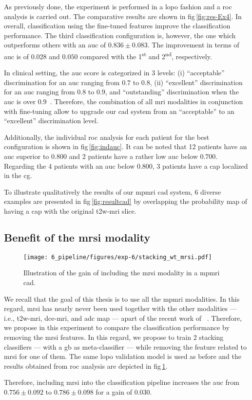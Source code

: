 As previously done, the experiment is performed in a \ac{lopo} fashion and a \ac{roc} analysis is carried out.
The comparative results are shown in \acs{fig}\,\ref{fig:res-Ex4}.
In overall, classification using the fine-tuned features improve the classification performance.
The third classification configuration is, however, the one which outperforms others with an \ac{auc} of $0.836 \pm 0.083$.
The improvement in terms of \ac{auc} is of $0.028$ and $0.050$ compared with the 1\textsuperscript{st} and 2\textsuperscript{nd}, respectively.

In clinical setting, the \ac{auc} score is categorized in 3 levels: (i) ``acceptable'' discrimination for an \ac{auc} ranging from $0.7$ to $0.8$, (ii) ``excellent'' discrimination for an \ac{auc} ranging from $0.8$ to $0.9$, and ``outstanding'' discrimination when the \ac{auc} is over $0.9$~\cite{hosmer2004applied}.
Therefore, the combination of all \ac{mri} modalities in conjunction with fine-tuning allow to upgrade our \ac{cad} system from an ``acceptable'' to an ``excellent'' discrimination level.

Additionally, the individual \ac{roc} analysis for each patient for the best configuration is shown in \acs{fig}\,\ref{fig:indauc}.
It can be noted that 12 patients have an \ac{auc} superior to $0.800$ and 2 patients have a rather low \ac{auc} below $0.700$.
Regarding the 4 patients with an \ac{auc} below $0.800$, 3 patients have a \ac{cap} localized in the \ac{cg}.

To illustrate qualitatively the results of our \ac{mpmri} \ac{cad} system, 6 diverse examples are presented in \acs{fig}\,\ref{fig:resultcad} by overlapping the probability map of having a \ac{cap} with the original \ac{t2w}-\ac{mri} slice.

\subsection{Benefit of the \acs*{mrsi} modality}\label{subsec:chp6:exp-res:Ex5}

\begin{figure}
  \centering
  \texttt{[image: 6\_pipeline/figures/exp-6/stacking\_wt\_mrsi.pdf]}
  \caption{Illustration of the gain of including the \acs*{mrsi} modality in a \acs*{mpmri} \acs*{cad}.}
  \label{fig:resmrsigain}
\end{figure}

We recall that the goal of this thesis is to use all the \ac{mpmri} modalities.
In this regard, \ac{mrsi} has nearly never been used together with the other modalities --- i.e., \ac{t2w}-\ac{mri}, \ac{dce}-\ac{mri}, and \ac{adc} map --- apart of the recent work of \citeauthor{trigui2017automatic}~\cite{trigui2016classification,trigui2017automatic}.
Therefore, we propose in this experiment to compare the classification performance by removing the \ac{mrsi} features.
In this regard, we propose to train 2 stacking classifiers --- with a \ac{gb} as meta-classifier --- while removing the feature related to \ac{mrsi} for one of them.
The same \ac{lopo} validation model is used as before and the results obtained from \ac{roc} analysis are depicted in \acs{fig}\,\ref{fig:resmrsigain}.

Therefore, including \ac{mrsi} into the classification pipeline increases the \ac{auc} from $0.756 \pm 0.092$ to $0.786 \pm 0.098$ for a gain of $0.030$.
